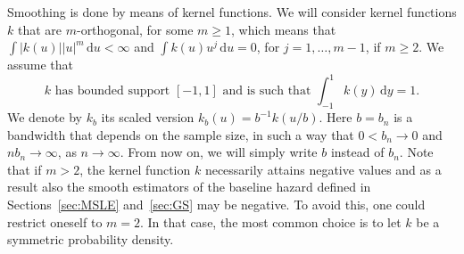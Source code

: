\documentclass[11pt,reqno]{amsart}
\theoremstyle{definition}
\theoremstyle{plain}
\theoremstyle{remark}
\begin{document}
Smoothing is done by means of kernel functions.
We will consider kernel functions $k$ that are $m$-orthogonal, for some $m\geq 1$,
which means that~$\int |k(u)||u|^m\,\mathrm{d}u<\infty$ and
$\int k(u)u^j\,\mathrm{d}u=0$, for $j=1,\ldots,m-1$, if $m\geq 2$.
We assume that
\begin{equation}
\label{def:kernel}
\text{$k$ has bounded support $[-1,1]$ and is such that $\int_{-1}^1 k(y)\,\mathrm{d}y=1$.}
\end{equation}
We denote by $k_b$ its scaled version $k_b(u)=b^{-1}k(u/b)$.
Here $b=b_n$ is a bandwidth that depends on the sample size, in such a way that
$0<b_n\to 0$ and $nb_n\to\infty$, as $n\to\infty$.
From now on, we will simply write $b$ instead of $b_n$.
Note that if $m>2$, the kernel function $k$ necessarily attains negative values and as a result also the smooth estimators of the baseline hazard defined in
Sections~\ref{sec:MSLE} and~\ref{sec:GS} may be negative.
To avoid this, one could restrict oneself to $m=2$.
In that case, the most common choice is to let $k$ be a symmetric probability density.
\end{document}
